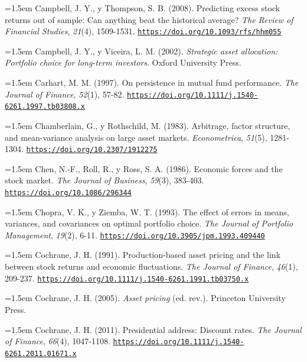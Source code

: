 \documentclass[10pt,a4paper]{article}
\begin{document}
\noindent\hangindent=1.5em Campbell, J. Y., y Thompson, S. B. (2008). Predicting excess stock returns out of sample: Can anything beat the historical average? \textit{The Review of Financial Studies}, \textit{21}(4), 1509-1531. \href{https://doi.org/10.1093/rfs/hhm055}{\nolinkurl{https://doi.org/10.1093/rfs/hhm055}}

\noindent\hangindent=1.5em Campbell, J. Y., y Viceira, L. M. (2002). \textit{Strategic asset allocation: Portfolio choice for long-term investors}. Oxford University Press.

\noindent\hangindent=1.5em Carhart, M. M. (1997). On persistence in mutual fund performance. \textit{The Journal of Finance}, \textit{52}(1), 57-82. \href{https://doi.org/10.1111/j.1540-6261.1997.tb03808.x}{\nolinkurl{https://doi.org/10.1111/j.1540-6261.1997.tb03808.x}}

\noindent\hangindent=1.5em Chamberlain, G., y Rothschild, M. (1983). Arbitrage, factor structure, and mean-variance analysis on large asset markets. \textit{Econometrica}, \textit{51}(5), 1281-1304. \href{https://doi.org/10.2307/1912275}{\nolinkurl{https://doi.org/10.2307/1912275}}

\noindent\hangindent=1.5em Chen, N.-F., Roll, R., y Ross, S. A. (1986). Economic forces and the stock market. \textit{The Journal of Business}, \textit{59}(3), 383-403. \href{https://doi.org/10.1086/296344}{\nolinkurl{https://doi.org/10.1086/296344}}

\noindent\hangindent=1.5em Chopra, V. K., y Ziemba, W. T. (1993). The effect of errors in means, variances, and covariances on optimal portfolio choice. \textit{The Journal of Portfolio Management}, \textit{19}(2), 6-11. \href{https://doi.org/10.3905/jpm.1993.409440}{\nolinkurl{https://doi.org/10.3905/jpm.1993.409440}}

\noindent\hangindent=1.5em Cochrane, J. H. (1991). Production-based asset pricing and the link between stock returns and economic fluctuations. \textit{The Journal of Finance}, \textit{46}(1), 209-237. \href{https://doi.org/10.1111/j.1540-6261.1991.tb03750.x}{\nolinkurl{https://doi.org/10.1111/j.1540-6261.1991.tb03750.x}}

\noindent\hangindent=1.5em Cochrane, J. H. (2005). \textit{Asset pricing} (ed. rev.). Princeton University Press.

\noindent\hangindent=1.5em Cochrane, J. H. (2011). Presidential address: Discount rates. \textit{The Journal of Finance}, \textit{66}(4), 1047-1108. \href{https://doi.org/10.1111/j.1540-6261.2011.01671.x}{\nolinkurl{https://doi.org/10.1111/j.1540-6261.2011.01671.x}}
\end{document}
